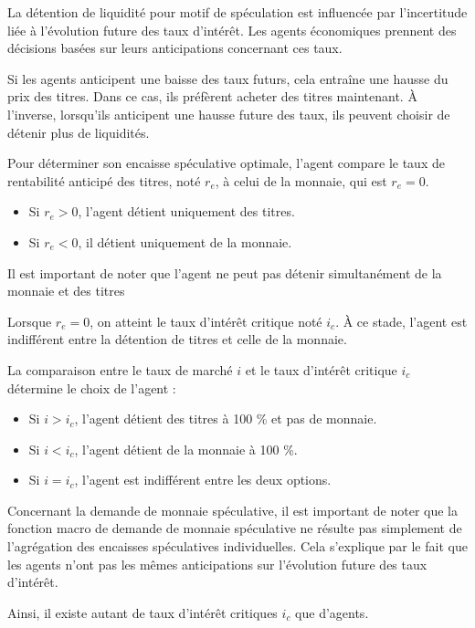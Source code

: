 \documentclass[a4paper, 12pt]{report}
\begin{document}
La détention de liquidité pour motif de spéculation est influencée par l'incertitude liée à l'évolution future des taux d'intérêt. Les agents économiques prennent des décisions basées sur leurs anticipations concernant ces taux.

Si les agents anticipent une baisse des taux futurs, cela entraîne une hausse du prix des titres. Dans ce cas, ils préfèrent acheter des titres maintenant. À l'inverse, lorsqu'ils anticipent une hausse future des taux, ils peuvent choisir de détenir plus de liquidités.

Pour déterminer son encaisse spéculative optimale, l'agent compare le taux de rentabilité anticipé des titres, noté \( r_e \), à celui de la monnaie, qui est \( r_e = 0 \). 

\begin{itemize}
	\item Si \( r_e > 0 \), l'agent détient uniquement des titres.
	\item Si \( r_e < 0 \), il détient uniquement de la monnaie.
\end{itemize}

Il est important de noter que l'agent ne peut pas détenir simultanément de la monnaie et des titres

Lorsque \( r_e = 0 \), on atteint le taux d'intérêt critique noté \( i_c \). À ce stade, l'agent est indifférent entre la détention de titres et celle de la monnaie. 

La comparaison entre le taux de marché \( i \) et le taux d'intérêt critique \( i_c \) détermine le choix de l'agent :
\begin{itemize}
	\item Si \( i > i_c \), l'agent détient des titres à 100 \% et pas de monnaie.
	\item Si \( i < i_c \), l'agent détient de la monnaie à 100 \%.
	\item Si \( i = i_c \), l'agent est indifférent entre les deux options.
\end{itemize}

Concernant la demande de monnaie spéculative, il est important de noter que la fonction macro de demande de monnaie spéculative ne résulte pas simplement de l'agrégation des encaisses spéculatives individuelles. Cela s'explique par le fait que les agents n'ont pas les mêmes anticipations sur l'évolution future des taux d'intérêt. 

Ainsi, il existe autant de taux d'intérêt critiques \( i_c \) que d'agents.
\end{document}
